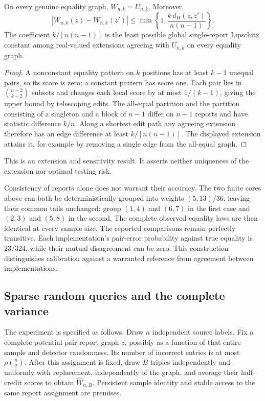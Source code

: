\begin{proposition}
On every genuine equality graph, $W_{n,k}=U_{n,k}$. Moreover,
\[
 |W_{n,k}(z)-W_{n,k}(z')|
 \le\min\left\{1,\frac{k\,d_H(z,z')}{n(n-1)}\right\}.
\]
The coefficient $k/[n(n-1)]$ is the least possible global single-report Lipschitz constant among real-valued extensions agreeing with $U_{n,k}$ on every equality graph.
\end{proposition}
\begin{proof}
A nonconstant equality pattern on $k$ positions has at least $k-1$ unequal pairs, so its score is zero; a constant pattern has score one. Each pair lies in $\binom{n-2}{k-2}$ subsets and changes each local score by at most $1/(k-1)$, giving the upper bound by telescoping edits. The all-equal partition and the partition consisting of a singleton and a block of $n-1$ differ on $n-1$ reports and have statistic difference $k/n$. Along a shortest edit path any agreeing extension therefore has an edge difference at least $k/[n(n-1)]$. The displayed extension attains it, for example by removing a single edge from the all-equal graph.
\end{proof}
This is an extension and sensitivity result. It asserts neither uniqueness of the extension nor optimal testing risk.

Consistency of reports alone does not warrant their accuracy. The two finite cores above can both be deterministically grouped into weights $(5,13)/36$, leaving their common tails unchanged: group $(1,4)$ and $(6,7)$ in the first case and $(2,3)$ and $(5,8)$ in the second. The complete observed equality laws are then identical at every sample size. The reported comparisons remain perfectly transitive. Each implementation's pair-error probability against true equality is $23/324$, while their mutual disagreement can be zero. This construction distinguishes calibration against a warranted reference from agreement between implementations.

\subsection{Sparse random queries and the complete variance}
\label{sam:sparse}
The experiment is specified as follows. Draw $n$ independent source labels. Fix a complete potential pair-report graph $z$, possibly as a function of that entire sample and detector randomness. Its number of incorrect entries is at most $\rho\binom n2$. After this assignment is fixed, draw $B$ triples independently and uniformly with replacement, independently of the graph, and average their half-credit scores to obtain $\widehat W_{n,B}$. Persistent sample identity and stable access to the same report assignment are premises.

